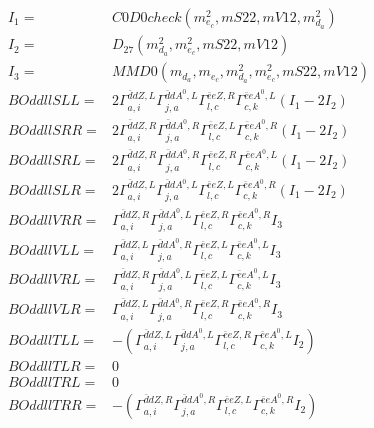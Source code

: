 \documentclass[A4,landscape]{article}
\begin{document}
\begin{align} 
I_1 = & C0D0check(m^2_{e_{{c}}}, mS22, mV12, m^2_{d_{{a}}}) \\ 
I_2 = & D_{27}(m^2_{d_{{a}}}, m^2_{e_{{c}}}, mS22, mV12) \\ 
I_3 = & MMD0(m_{d_{{a}}}, m_{e_{{c}}}, m^2_{d_{{a}}}, m^2_{e_{{c}}}, mS22, mV12) \\ 
  BOddllSLL= & 2  \Gamma^{\bar{d}d Z ,L}_{a, i} \Gamma^{\bar{d}d A^0 ,L}_{j, a} \Gamma^{\bar{e}e Z ,R}_{l, c} \Gamma^{\bar{e}e A^0 ,L}_{c, k} (I_1 - 2 I_2) \\ 
  BOddllSRR= & 2  \Gamma^{\bar{d}d Z ,R}_{a, i} \Gamma^{\bar{d}d A^0 ,R}_{j, a} \Gamma^{\bar{e}e Z ,L}_{l, c} \Gamma^{\bar{e}e A^0 ,R}_{c, k} (I_1 - 2 I_2) \\ 
  BOddllSRL= & 2  \Gamma^{\bar{d}d Z ,R}_{a, i} \Gamma^{\bar{d}d A^0 ,R}_{j, a} \Gamma^{\bar{e}e Z ,R}_{l, c} \Gamma^{\bar{e}e A^0 ,L}_{c, k} (I_1 - 2 I_2) \\ 
  BOddllSLR= & 2  \Gamma^{\bar{d}d Z ,L}_{a, i} \Gamma^{\bar{d}d A^0 ,L}_{j, a} \Gamma^{\bar{e}e Z ,L}_{l, c} \Gamma^{\bar{e}e A^0 ,R}_{c, k} (I_1 - 2 I_2) \\ 
  BOddllVRR= &  \Gamma^{\bar{d}d Z ,R}_{a, i} \Gamma^{\bar{d}d A^0 ,L}_{j, a} \Gamma^{\bar{e}e Z ,R}_{l, c} \Gamma^{\bar{e}e A^0 ,R}_{c, k} I_3 \\ 
  BOddllVLL= &  \Gamma^{\bar{d}d Z ,L}_{a, i} \Gamma^{\bar{d}d A^0 ,R}_{j, a} \Gamma^{\bar{e}e Z ,L}_{l, c} \Gamma^{\bar{e}e A^0 ,L}_{c, k} I_3 \\ 
  BOddllVRL= &  \Gamma^{\bar{d}d Z ,R}_{a, i} \Gamma^{\bar{d}d A^0 ,L}_{j, a} \Gamma^{\bar{e}e Z ,L}_{l, c} \Gamma^{\bar{e}e A^0 ,L}_{c, k} I_3 \\ 
  BOddllVLR= &  \Gamma^{\bar{d}d Z ,L}_{a, i} \Gamma^{\bar{d}d A^0 ,R}_{j, a} \Gamma^{\bar{e}e Z ,R}_{l, c} \Gamma^{\bar{e}e A^0 ,R}_{c, k} I_3 \\ 
  BOddllTLL= & -( \Gamma^{\bar{d}d Z ,L}_{a, i} \Gamma^{\bar{d}d A^0 ,L}_{j, a} \Gamma^{\bar{e}e Z ,R}_{l, c} \Gamma^{\bar{e}e A^0 ,L}_{c, k} I_2) \\ 
  BOddllTLR= & 0 \\ 
  BOddllTRL= & 0 \\ 
  BOddllTRR= & -( \Gamma^{\bar{d}d Z ,R}_{a, i} \Gamma^{\bar{d}d A^0 ,R}_{j, a} \Gamma^{\bar{e}e Z ,L}_{l, c} \Gamma^{\bar{e}e A^0 ,R}_{c, k} I_2) \\ 
\end{align} 
\end{document}
